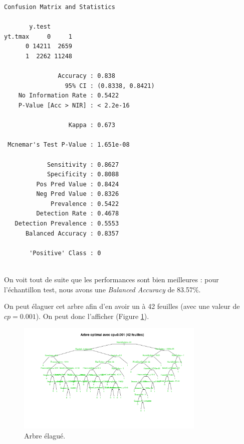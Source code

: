 \documentclass{article}
\begin{document}
\begin{verbatim}
Confusion Matrix and Statistics

       y.test
yt.tmax     0     1
      0 14211  2659
      1  2262 11248
                                          
               Accuracy : 0.838           
                 95% CI : (0.8338, 0.8421)
    No Information Rate : 0.5422          
    P-Value [Acc > NIR] : < 2.2e-16       
                                          
                  Kappa : 0.673           
                                          
 Mcnemar's Test P-Value : 1.651e-08       
                                          
            Sensitivity : 0.8627          
            Specificity : 0.8088          
         Pos Pred Value : 0.8424          
         Neg Pred Value : 0.8326          
             Prevalence : 0.5422          
         Detection Rate : 0.4678          
   Detection Prevalence : 0.5553          
      Balanced Accuracy : 0.8357          
                                          
       'Positive' Class : 0               
                              
\end{verbatim}
     
On voit tout de suite que les performances sont bien meilleures : pour l'échantillon test, nous avons une \emph{Balanced Accuracy} de 83.57\%. 

On peut élaguer cet arbre afin d'en avoir un à 42 feuilles (avec une valeur de $cp=0.001$). On peut donc l'afficher (Figure \ref{fig:topt}). 

\begin{figure}[htp]
    \centering
    \includegraphics[width=0.8\textwidth]{Images/topt.png}
    \caption{Arbre élagué.}
    \label{fig:topt}
\end{figure}
\end{document}
